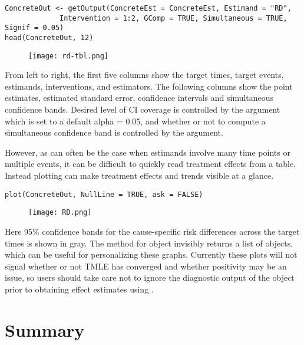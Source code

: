 \begin{verbatim}
ConcreteOut <- getOutput(ConcreteEst = ConcreteEst, Estimand = "RD",
             Intervention = 1:2, GComp = TRUE, Simultaneous = TRUE, Signif = 0.05)
head(ConcreteOut, 12)
\end{verbatim}

\begin{figure}[H]
\centering
\texttt{[image: rd-tbl.png]}
\end{figure}

From left to right, the first five columns show the target times, target events, estimands, interventions, and estimators. The following columns show the point estimates, estimated standard error, confidence intervals and simultaneous confidence bands. Desired level of CI coverage is controlled by the  argument which is set to a default alpha = 0.05, and whether or not to compute a simultaneous confidence band is controlled by the  argument.

However, as can often be the case when estimands involve many time points or multiple events, it can be difficult to quickly read treatment effects from a table. Instead plotting can make treatment effects and trends visible at a glance.

\begin{verbatim}
plot(ConcreteOut, NullLine = TRUE, ask = FALSE)
\end{verbatim}

\begin{figure}[H]
\texttt{[image: RD.png]}
\end{figure}

Here 95\% confidence bands for the cause-specific risk differences across the target times is shown in gray. The  method for  object invisibly returns a list of  objects, which can be useful for personalizing these graphs. Currently these plots will not signal whether or not TMLE has converged and whether positivity may be an issue, so users should take care not to ignore the diagnostic output of the  object prior to obtaining effect estimates using .

\hypertarget{sec-summary}{%
\section{Summary}\label{sec-summary}}

